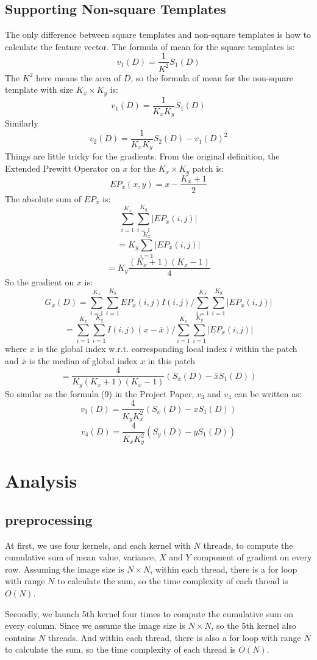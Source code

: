 \documentclass[12pt, a4paper]{article}
\begin{document}
  \subsection{Supporting Non-square Templates}\label{non-square}
    The only difference between square templates and non-square templates is how
    to calculate the feature vector. The formula of mean for the square templates
    is:
    \[v_1(D)=\frac{1}{K^2}S_1(D)\]
    The $K^2$ here means the area of $D$, so the formula of mean for the non-square
    template with size $K_x\times K_y$ is:
    \[v_1(D)=\frac{1}{K_xK_y}S_1(D)\]
    Similarly
    \[v_2(D)=\frac{1}{K_xK_y}S_2(D)-v_1(D)^2\]
    Things are little tricky for the gradients. From the original definition,
    the Extended Prewitt Operator on $x$ for the $K_x\times K_y$ patch is:
    \[EP_x(x, y)=x-\frac{K_x+1}{2}\]
    The absolute sum of $EP_x$ is:
    \[\sum_{i=1}^{K_x}\sum_{i=1}^{K_y}\left|EP_x(i,j)\right|\]
    \[=K_y\sum_{i=1}^{K_x}\left|EP_x(i,j)\right|\]
    \[=K_y\frac{(K_x+1)(K_x-1)}{4}\]
    So the gradient on $x$ is:
    \[G_x(D)=\sum_{i=1}^{K_x}\sum_{i=1}^{K_y}EP_x(i,j)I(i,j)/
      \sum_{i=1}^{K_x}\sum_{i=1}^{K_y}\left|EP_x(i,j)\right|\]
    \[=\sum_{i=1}^{K_x}\sum_{i=1}^{K_y}I(i,j)(x-\bar{x})/
      \sum_{i=1}^{K_x}\sum_{i=1}^{K_y}\left|EP_x(i,j)\right|\]
    where $x$ is the global index w.r.t. corresponding local index $i$ within the
    patch and $\bar{x}$ is the median of global index $x$ in this patch
    \[=\frac{4}{K_y(K_x+1)(K_x-1)}(S_x(D)-\bar{x}S_1(D))\]
    So similar as the formula (9) in the Project Paper, $v_3$ and $v_4$ can be
    written as:
    \[v_3(D)=\frac{4}{K_yK_x^2}(S_x(D)-xS_1(D))\]
    \[v_4(D)=\frac{4}{K_xK_y^2}(S_y(D)-yS_1(D))\]

\section{Analysis}
  \subsection{preprocessing}
  At first, we use four kernels, and each kernel with $N$ threads, to compute the
  cumulative sum of mean value, variance, $X$ and $Y$ component of gradient on
  every row. Assuming the image size is $N \times N$, within each thread, there is
  a for loop with range $N$ to calculate the sum, so the time complexity of
  each thread is $O(N)$.

  Secondly, we launch 5th kernel four times to compute the cumulative sum on every column.
  Since we assume the image size is $N \times N$, so the 5th kernel also contains
  $N$ threads. And within each thread, there is also a for loop with range $N$ to
  calculate the sum, so the time complexity of each thread is $O(N)$.
\end{document}
